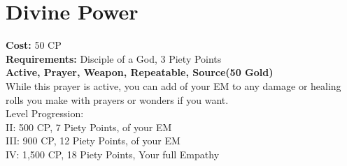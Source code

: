 \section{Divine Power}\label{prayer:divinePower}
\textbf{Cost:} 50 CP\\
\textbf{Requirements:} Disciple of a God, 3 Piety Points \\
\textbf{Active, Prayer, Weapon, Repeatable, Source(50 Gold)}\\
While this prayer is active, you can add  of your EM to any damage or healing rolls you make with prayers or wonders if you want.
\\
Level Progression:\\
II: 500 CP, 7 Piety Points,  of your EM\\
III: 900 CP, 12 Piety Points,  of your EM\\
IV: 1,500 CP, 18 Piety Points, Your full Empathy\\
